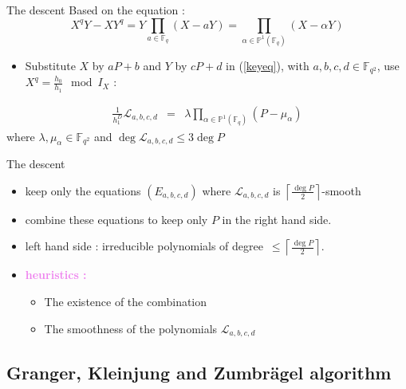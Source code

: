 \documentclass[xcolor=x11names,compress]{beamer}
\theoremstyle{break}
\theoremstyle{sc}
\theoremstyle{definition}
\theoremstyle{remark}
\begin{document}
\begin{frame}{The descent}
    Based on the equation : 
 \begin{equation}
   X^qY - XY^q = Y\prod_{a\in\mathbb{F}_q}(X - aY) =
   \prod_{\alpha\in\mathbb{P}^1(\mathbb{F}_q)}(X-\alpha Y)
   \label{keyeq}
 \end{equation}
 
 \begin{itemize}
   \item Substitute $X$ by $aP + b$ and $Y$ by $cP + d$ in (\ref{keyeq}), with
     $a, b, c, d \in \mathbb{F}_{q^2}$, use $X^q =\frac{h_0}{h_1}\mod I_X$ : 

 \end{itemize}
  \begin{eqnarray*}
    \frac{1}{h_1^D}\mathcal L_{a, b, c, d} &=& \lambda
    \prod_{\alpha\in\mathbb{P}^1(\mathbb{F}_q)}(P-\mu_\alpha)
  \end{eqnarray*}
  where $\lambda, \mu_\alpha\in\mathbb{F}_{q^2}$ and $\deg\mathcal L_{a, b, c,
  d}\leq 3\deg P$   
\end{frame}

\begin{frame}{The descent}
  \begin{itemize}
    \item keep only the equations $(E_{a, b, c, d})$ where $\mathcal L_{a, b, c, d}$ is
  $\left\lceil \frac{\deg P}{2}\right\rceil$-smooth
\item combine these equations to keep only $P$ in the right hand side.
\item left hand side : irreducible polynomials 
  of degree~$\leq\left\lceil \frac{\deg P}{2}\right\rceil$.
  \end{itemize}


  \begin{itemize}
    \item \textcolor{violet}{\textbf{heuristics :}}
      \begin{itemize}
        \item The existence of the combination
        \item The smoothness of the polynomials $\mathcal L_{a, b, c, d}$
      \end{itemize}
  \end{itemize}
\end{frame}


\subsection{Granger, Kleinjung and Zumbrägel algorithm}
\end{document}

